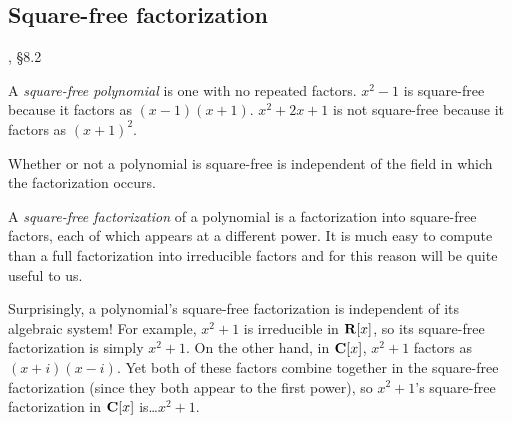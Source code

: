 \begin{comment}
There is only one way to extend an ordered integral domain into an
ordered quotient field.

Next, we introduce real numbers individually as Cauchy sequences and
collectively as an extension field, ordered by showing that the
trailing terms in such a sequence must either converge to zero or
become uniformly positive or negative, establishing O1.  A little more
work is then needed to show that O2 and O3 hold, and that the
Archemedian property carries through.

Next, we show that square roots always exist, as Cauchy sequences, for
all positive numbers.  This requires constructing a sequence of larger
and larger numbers, each of which we square, invert, multiply by 2,
and use A1 to demand an even larger element of {\bf Q}.  Fill in the
details.  Might need Archmedian property for this.

Next, construct ${\bf C}$ by extending algebraically to adjoin $i$,
and use the prior result to demonstrate that square roots exist for
all numbers in ${\bf C}$.  Then introduce the modulus of a complex
number and establish that $|1+\gamma|\le 1+|\gamma|$.

\end{comment}

\subsection*{\qquad Square-free factorization}

\hbox{}\qquad [Ge92], \S 8.2

A {\it square-free polynomial} is one with no repeated factors.
$x^2-1$ is square-free because it factors as $(x-1)(x+1)$.  $x^2+2x+1$
is not square-free because it factors as $(x+1)^2$.

Whether or not a polynomial is square-free is independent of the field
in which the factorization occurs.

A {\it square-free factorization} of a polynomial is a factorization
into square-free factors, each of which appears at a different power.
It is much easy to compute than a full factorization into irreducible
factors and for this reason will be quite useful to us.

Surprisingly, a polynomial's square-free factorization is independent
of its algebraic system!  For example, $x^2+1$ is irreducible in ${\bf
R}[x]$, so its square-free factorization is simply $x^2+1$.  On the
other hand, in ${\bf C}[x]$, $x^2+1$ factors as $(x+i)(x-i)$.  Yet
both of these factors combine together in the square-free
factorization (since they both appear to the first power), so
$x^2+1$'s square-free factorization in ${\bf C}[x]$ is\ldots $x^2+1$.

